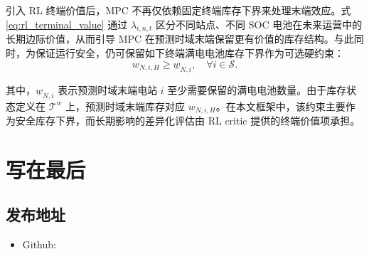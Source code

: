 \documentclass[12pt,hyperref,a4paper,UTF8]{ctexart}
\begin{document}

引入 RL 终端价值后，MPC 不再仅依赖固定终端库存下界来处理末端效应。式\eqref{eq:rl_terminal_value} 通过 $\lambda_{i,n,t}$ 区分不同站点、不同 SOC 电池在未来运营中的长期边际价值，从而引导 MPC 在预测时域末端保留更有价值的库存结构。与此同时，为保证运行安全，仍可保留如下终端满电电池库存下界作为可选硬约束：
\begin{equation}
w_{N,i,H}\ge \underline{w}_{N,i},
\quad \forall i\in \mathcal{S}.
\tag{9i}
\end{equation}

其中，$\underline{w}_{N,i}$ 表示预测时域末端电站 $i$ 至少需要保留的满电电池数量。由于库存状态定义在 $\mathcal{T}^{w}$ 上，预测时域末端库存对应 $w_{N,i,H}$。在本文框架中，该约束主要作为安全库存下界，而长期影响的差异化评估由 RL critic 提供的终端价值项承担。

\section{写在最后}
\subsection{发布地址}
\begin{itemize}
    \item Github: 
\end{itemize}


\end{document}
